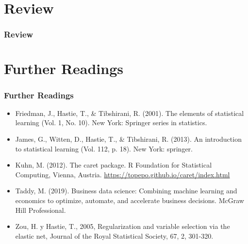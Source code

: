 \documentclass[
  shownotes,
  xcolor={svgnames},
  hyperref={colorlinks,citecolor=DarkBlue,linkcolor=DarkRed,urlcolor=DarkBlue}
  , aspectratio=169]{beamer}
\begin{document}
\section{Review}
\begin{frame}[fragile]
\frametitle{Review}

   

 \end{frame}
\section{Further Readings}
\begin{frame}
\frametitle{Further Readings}

\begin{itemize}


  \item Friedman, J., Hastie, T., \& Tibshirani, R. (2001). The elements of statistical learning (Vol. 1, No. 10). New York: Springer series in statistics.
  \medskip
  \item James, G., Witten, D., Hastie, T., \& Tibshirani, R. (2013). An introduction to statistical learning (Vol. 112, p. 18). New York: springer.
  \medskip
  \item Kuhn, M. (2012). The caret package. R Foundation for Statistical Computing, Vienna, Austria. \url{https://topepo.github.io/caret/index.html}
  \medskip
  \item Taddy, M. (2019). Business data science: Combining machine learning and economics to optimize, automate, and accelerate business decisions. McGraw Hill Professional.
  \medskip
  \item  Zou, H. y Hastie, T., 2005, Regularization and variable selection via the elastic net, Journal of the Royal Statistical Society, 67, 2, 301-320.
  
\end{itemize}

\end{frame}






\end{document}
